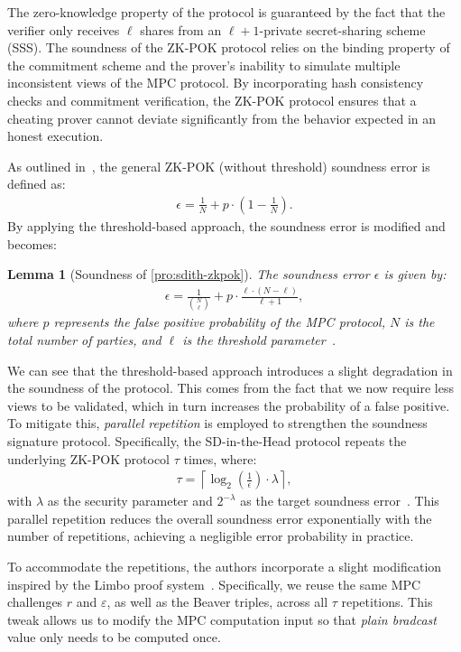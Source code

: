 \documentclass[11pt]{report}
\theoremstyle{definition}
\theoremstyle{plain}
\newtheorem{lemma}{Lemma}[section]
\begin{document}
The zero-knowledge property of the protocol is guaranteed by the fact that the verifier only receives $\ell$ shares from an $\ell + 1$-private secret-sharing scheme (SSS).
The soundness of the ZK-POK protocol relies on the binding property of the commitment scheme and the prover's inability to simulate multiple inconsistent views of the MPC protocol. By incorporating hash consistency checks and commitment verification, the ZK-POK protocol ensures that a cheating prover cannot deviate significantly from the behavior expected in an honest execution.

As outlined in~\cite{feneuil2023threshold}, the general ZK-POK (without threshold) soundness error is defined as:
\begin{align*}
  \epsilon = \frac{1}{N} + p \cdot \left(1 - \frac{1}{N}\right).
\end{align*}
By applying the threshold-based approach, the soundness error is modified and becomes:
\begin{lemma}[Soundness of \autoref{pro:sdith-zkpok}]
  The soundness error $\epsilon$ is given by:
  \begin{align*}
    \epsilon = \frac{1}{\binom{N}{\ell}} + p \cdot \frac{\ell \cdot (N - \ell)}{\ell + 1},
  \end{align*}
  where $p$ represents the false positive probability of the MPC protocol, $N$ is the total number of parties, and $\ell$ is the threshold parameter~\cite{feneuil2023threshold}.
\end{lemma}
We can see that the threshold-based approach introduces a slight degradation in the soundness of the protocol. This comes from the fact that we now require less views to be validated, which in turn increases the probability of a false positive.
To mitigate this, \textit{parallel repetition} is employed to strengthen the soundness signature protocol. Specifically, the SD-in-the-Head protocol repeats the underlying ZK-POK protocol $\tau$ times, where:
\begin{align*}
  \tau = \left\lceil \log_2\left(\frac{1}{\epsilon}\right) \cdot \lambda \right\rceil,
\end{align*}
with $\lambda$ as the security parameter and $2^{-\lambda}$ as the target soundness error~\cite{aguilarsyndrome11}. This parallel repetition reduces the overall soundness error exponentially with the number of repetitions, achieving a negligible error probability in practice.

To accommodate the repetitions, the authors incorporate a slight modification inspired by the Limbo proof system~\cite{delpech2021limbo}. Specifically, we reuse the same MPC challenges $r$ and $\varepsilon$, as well as the Beaver triples, across all $\tau$ repetitions. This tweak allows us to modify the MPC computation input so that \textit{plain bradcast} value only needs to be computed once.
\end{document}
